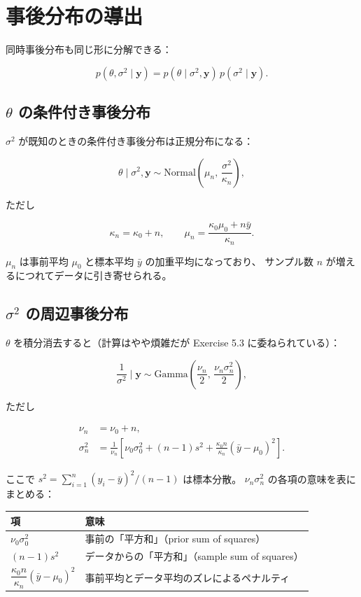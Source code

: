 \documentclass[12pt,a4paper]{ltjsarticle}
\begin{document}
\section{事後分布の導出}

同時事後分布も同じ形に分解できる：

\[
  p(\theta, \sigma^2 \mid \mathbf{y})
  = p(\theta \mid \sigma^2, \mathbf{y})\, p(\sigma^2 \mid \mathbf{y}).
\]

\subsection{$\theta$ の条件付き事後分布}

$\sigma^2$ が既知のときの条件付き事後分布は正規分布になる：

\[
  \theta \mid \sigma^2, \mathbf{y} \sim \mathrm{Normal}\!\left(\mu_n,\, \frac{\sigma^2}{\kappa_n}\right),
\]

ただし

\[
  \kappa_n = \kappa_0 + n, \qquad
  \mu_n = \frac{\kappa_0 \mu_0 + n\bar{y}}{\kappa_n}.
\]

$\mu_n$ は事前平均 $\mu_0$ と標本平均 $\bar{y}$ の加重平均になっており、
サンプル数 $n$ が増えるにつれてデータに引き寄せられる。

\subsection{$\sigma^2$ の周辺事後分布}

$\theta$ を積分消去すると（計算はやや煩雑だが Exercise 5.3 に委ねられている）：

\[
  \frac{1}{\sigma^2} \mid \mathbf{y} \sim \mathrm{Gamma}\!\left(\frac{\nu_n}{2},\, \frac{\nu_n\sigma_n^2}{2}\right),
\]

ただし

\begin{align*}
  \nu_n &= \nu_0 + n, \\
  \sigma_n^2 &= \frac{1}{\nu_n}\left[\nu_0\sigma_0^2 + (n-1)s^2 + \frac{\kappa_0 n}{\kappa_n}(\bar{y} - \mu_0)^2\right].
\end{align*}

ここで $s^2 = \sum_{i=1}^n (y_i - \bar{y})^2/(n-1)$ は標本分散。
$\nu_n \sigma_n^2$ の各項の意味を表にまとめる：

\bigskip
\begin{center}
\begin{tabular}{ll}
\toprule
項 & 意味 \\
\midrule
$\nu_0\sigma_0^2$ & 事前の「平方和」（prior sum of squares）\\
$(n-1)s^2$ & データからの「平方和」（sample sum of squares）\\
$\dfrac{\kappa_0 n}{\kappa_n}(\bar{y}-\mu_0)^2$ & 事前平均とデータ平均のズレによるペナルティ\\
\bottomrule
\end{tabular}
\end{center}
\end{document}
